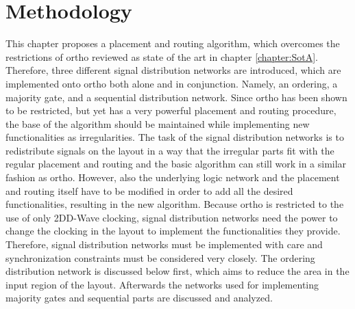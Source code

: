\chapter{Methodology}\label{chapter:Methodology}
This chapter proposes a placement and routing algorithm, which overcomes the restrictions of ortho reviewed as state of the art in chapter \ref{chapter:SotA}. Therefore, three different signal distribution networks are introduced, which are implemented onto ortho both alone and in conjunction. Namely, an ordering, a majority gate, and a sequential distribution network. Since ortho has been shown to be restricted, but yet has a very powerful placement and routing procedure, the base of the algorithm should be maintained while implementing new functionalities as irregularities. The task of the signal distribution networks is to redistribute signals on the layout in a way that the irregular parts fit with the regular placement and routing and the basic algorithm can still work in a similar fashion as ortho. However, also the underlying logic network and the placement and routing itself have to be modified in order to add all the desired functionalities, resulting in the new algorithm.
Because ortho is restricted to the use of only 2DD-Wave clocking, signal distribution networks need the power to change the clocking in the layout to implement the functionalities they provide. Therefore, signal distribution networks must be implemented with care and synchronization constraints must be considered very closely.
The ordering distribution network is discussed below first, which aims to reduce the area in the input region of the layout. Afterwards the networks used for implementing majority gates and sequential parts are discussed and analyzed.

